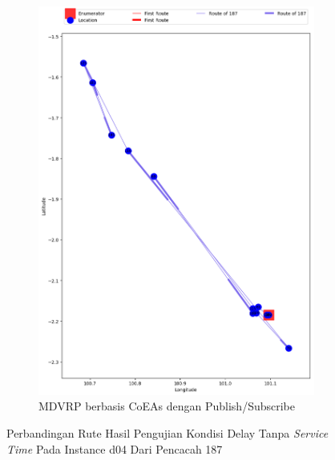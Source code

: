 \begin{figure}[H]\ContinuedFloat
	\centering
	\begin{subfigure}[t]{\textwidth}
		\centering
		\includegraphics[width=\textwidth]{Resources/Images/delayed_5/real_m15_n100_delayed_5_187_pubsub_coes}
		\caption{MDVRP berbasis CoEAs dengan Publish/Subscribe}
		\label{fig:real_m15_n100_delayed_5_187_pubsub_coes}
	\end{subfigure}
	\caption{Perbandingan Rute Hasil Pengujian Kondisi Delay Tanpa \textit{Service Time} Pada Instance d04 Dari Pencacah 187}
	\label{fig:real_m15_n100_delayed_5_187_contd}
\end{figure}


